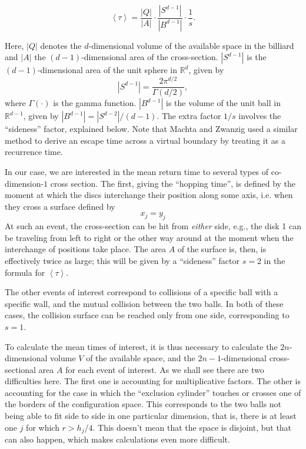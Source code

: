 \documentclass[superscriptaddress,pre,reprint,showpacs,twocolumn]{revtex4-1}
\newcommand{\mean}[1]{\left \langle #1 \right \rangle}
\newcommand{\RR}{\mathbb{R}}
\begin{document}
\begin{equation}\label{meanfreetime}
 \mean{\tau} = \frac{|Q|}{|A|} \cdot \frac{|S^{d-1}|} {|B^{d-1}|} \cdot \frac{1}{s}.
\end{equation}


Here, $|Q|$ denotes the $d$-dimensional volume of the available 
space in the billiard and 
$|A|$ the $(d-1)$-dimensional area of the cross-section.
 $|S^{d-1}|$ is the $(d-1)$-dimensional area of the unit sphere in $\RR^d$, given by
\begin{equation}
  |S^{d-1}| = \frac{2 \pi^{d/2}}{\Gamma(d/2)},
\end{equation}
where $\Gamma(\cdot)$ is the gamma function. 
$|B^{d-1}|$ is the volume of the unit ball 
in $\RR^{d-1}$, given by $|B^{d-1}| = |S^{d-2}| / (d-1)$.
The extra factor $1/s$ involves the ``sideness'' factor, explained below.
Note that Machta and Zwanzig \cite{MachtaZwan} used a similar method to derive an escape 
time across a virtual boundary by treating it as a recurrence time.


In our case, we are interested in the mean return time to 
several types of co-dimension-$1$ cross section.
The first, giving the ``hopping time'', 
is defined by the moment
at which the discs interchange their position along some axis, i.e.
when they cross a surface defined by
\begin{equation} \label{condhop}
x_j = y_j 
\end{equation}
At such an event, the cross-section can be hit from \emph{either} side,
e.g., the disk 1 can be traveling from left to right or the other way around
at the moment when the interchange of positions take place. 
The area $A$ of the surface is, then, 
 is effectively twice as large; this will be given by a ``sideness'' factor $s=2$ in the formula
for $\mean{\tau}$.

The other events of interest correspond to collisions of a specific
ball with a specific wall, and the mutual collision between the two balls.
In both of these cases, the collision surface can be reached only from one side, corresponding to $s = 1$.

To calculate the mean times of interest, it is thus necessary to calculate
the $2n$-dimensional volume $V$ of the available space, and the $2n-1$-dimensional cross-sectional area $A$ 
for each event of interest. As we shall see there are two difficulties here.
The first one is accounting for multiplicative factors. The other is accounting for
the case in which the ``exclusion cylinder'' touches or crosses one of the borders of
the configuration space. This corresponds to the two balls not being able to fit
side to side in one particular dimension, that is, there is at least one $j$ for
which $r>h_j/4$. This doesn't mean that the space is disjoint, but that can also
happen, which makes calculations even more difficult.
\end{document}
